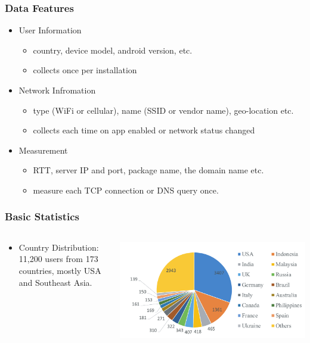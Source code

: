 \begin{frame}
    \frametitle{Data Features}
    \begin{itemize}
        \item User Information
        \begin{itemize}
            \item country, device model, android version, etc.
            \item collects once per installation
        \end{itemize}

        \item Network Infromation
        \begin{itemize}
            \item type (WiFi or cellular), name (SSID or vendor name), geo-location etc.
            \item collects each time on app enabled or network status changed
        \end{itemize}

        \item Measurement
        \begin{itemize}
            \item RTT, server IP and port, package name, the domain name etc.
            \item measure each TCP connection or DNS query once.
        \end{itemize}
    \end{itemize}
\end{frame}

\begin{frame}
    \frametitle{Basic Statistics}

    \begin{columns}
        \begin{column}{.35\textwidth}
            \begin{itemize}
                \item Country Distribution: 11,200 users from 173 countries, mostly USA and Southeast Asia.
            \end{itemize}
        \end{column}

        \begin{column}{.65\textwidth}
            \includegraphics[width=\textwidth]{fig/user_country.pdf}
        \end{column}
    \end{columns}
\end{frame}

